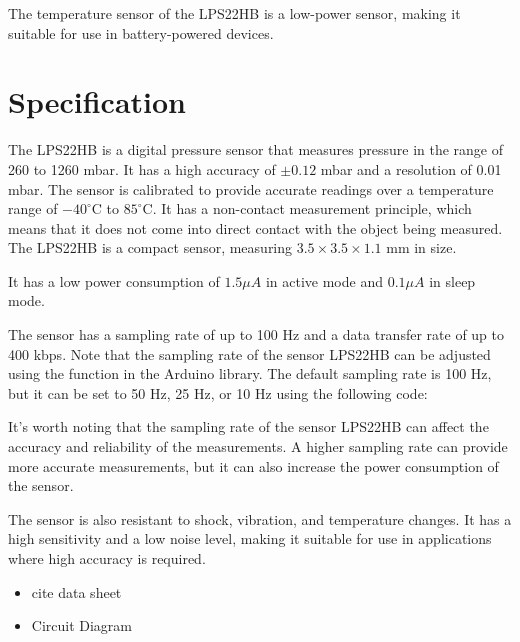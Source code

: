 The temperature sensor of the LPS22HB is a low-power sensor, making it suitable for use in battery-powered devices. 


\section{Specification}

The LPS22HB is a digital pressure sensor that measures pressure in the range of 260 to 1260 mbar. It has a high accuracy of $\pm0.12$ mbar and a resolution of 0.01 mbar. The sensor is calibrated to provide accurate readings over a temperature range of $-40^\circ$C to $85^\circ$C. It has a non-contact measurement principle, which means that it does not come into direct contact with the object being measured. The LPS22HB is a compact sensor, measuring $3.5 \times 3.5 \times 1.1$ mm in size. 

It has a low power consumption of $1.5 \mu A$ in active mode and $0.1 \mu A$ in sleep mode.

The sensor has a sampling rate of up to 100 Hz and a data transfer rate of up to 400 kbps. Note that the sampling rate of the sensor LPS22HB can be adjusted using the function  in the Arduino library. The default sampling rate is 100 Hz, but it can be set to 50 Hz, 25 Hz, or 10 Hz using the following code:

\medskip




\medskip


It's worth noting that the sampling rate of the sensor LPS22HB can affect the accuracy and reliability of the measurements. A higher sampling rate can provide more accurate measurements, but it can also increase the power consumption of the sensor.


 The sensor is also resistant to shock, vibration, and temperature changes. It has a high sensitivity and a low noise level, making it suitable for use in applications where high accuracy is required. 



\begin{itemize}
  \item cite data sheet
  \item Circuit Diagram
\end{itemize}

